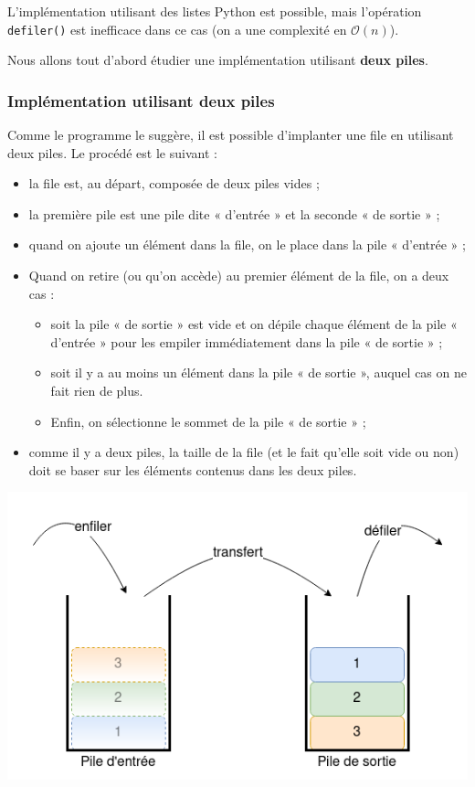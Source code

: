 \documentclass[
  a4paper,
  DIV=11,
  numbers=noendperiod]{scrartcl}
\providecommand{\tightlist}{%
  \setlength{\itemsep}{0pt}\setlength{\parskip}{0pt}}\usepackage{longtable,booktabs,array}
\begin{document}
L'implémentation utilisant des listes Python est possible, mais
l'opération \texttt{defiler()} est inefficace dans ce cas (on a une
complexité en \(\mathcal{O}(n)\)).

Nous allons tout d'abord étudier une implémentation utilisant
\textbf{deux piles}.

\hypertarget{impluxe9mentation-utilisant-deux-piles}{%
\subsubsection{Implémentation utilisant deux
piles}\label{impluxe9mentation-utilisant-deux-piles}}

Comme le programme le suggère, il est possible d'implanter une file en
utilisant deux piles. Le procédé est le suivant :

\begin{itemize}
\item
  la file est, au départ, composée de deux piles vides ;
\item
  la première pile est une pile dite « d'entrée » et la seconde « de
  sortie » ;
\item
  quand on ajoute un élément dans la file, on le place dans la pile «
  d'entrée » ;
\item
  Quand on retire (ou qu'on accède) au premier élément de la file, on a
  deux cas :

  \begin{itemize}
  \tightlist
  \item
    soit la pile « de sortie » est vide et on dépile chaque élément de
    la pile « d'entrée » pour les empiler immédiatement dans la pile «
    de sortie » ;
  \item
    soit il y a au moins un élément dans la pile « de sortie », auquel
    cas on ne fait rien de plus.
  \item
    Enfin, on sélectionne le sommet de la pile « de sortie » ;
  \end{itemize}
\item
  comme il y a deux piles, la taille de la file (et le fait qu'elle soit
  vide ou non) doit se baser sur les éléments contenus dans les deux
  piles.
\end{itemize}

\includegraphics{file2piles.png}
\end{document}
